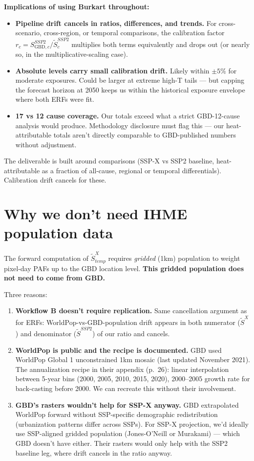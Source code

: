 \documentclass[11pt]{article}
\begin{document}
\textbf{Implications of using Burkart throughout:}
\begin{itemize}
\item \textbf{Pipeline drift cancels in ratios, differences, and trends.} For cross-scenario, cross-region, or temporal comparisons, the calibration factor $r_c = S^{SSP2}_{\text{GBD},c}/\tilde{S}^{SSP2}_c$ multiplies both terms equivalently and drops out (or nearly so, in the multiplicative-scaling case).
\item \textbf{Absolute levels carry small calibration drift.} Likely within $\pm 5\%$ for moderate exposures. Could be larger at extreme high-T tails --- but capping the forecast horizon at 2050 keeps us within the historical exposure envelope where both ERFs were fit.
\item \textbf{17 vs 12 cause coverage.} Our totals exceed what a strict GBD-12-cause analysis would produce. Methodology disclosure must flag this --- our heat-attributable totals aren't directly comparable to GBD-published numbers without adjustment.
\end{itemize}

The deliverable is built around comparisons (SSP-X vs SSP2 baseline, heat-attributable as a fraction of all-cause, regional or temporal differentials). Calibration drift cancels for these.

\section{Why we don't need IHME population data}

The forward computation of $\tilde{S}^X_{temp}$ requires \emph{gridded} (1km) population to weight pixel-day PAFs up to the GBD location level. \textbf{This gridded population does not need to come from GBD.}

Three reasons:
\begin{enumerate}
\item \textbf{Workflow B doesn't require replication.} Same cancellation argument as for ERFs: WorldPop-vs-GBD-population drift appears in both numerator ($\tilde{S}^X$) and denominator ($\tilde{S}^{SSP2}$) of our ratio and cancels.

\item \textbf{WorldPop is public and the recipe is documented.} GBD used WorldPop Global 1 unconstrained 1km mosaic (last updated November 2021). The annualization recipe in their appendix (p.~26): linear interpolation between 5-year bins (2000, 2005, 2010, 2015, 2020), 2000--2005 growth rate for back-casting before 2000. We can recreate this without their involvement.

\item \textbf{GBD's rasters wouldn't help for SSP-X anyway.} GBD extrapolated WorldPop forward without SSP-specific demographic redistribution (urbanization patterns differ across SSPs). For SSP-X projection, we'd ideally use SSP-aligned gridded population (Jones-O'Neill or Murakami) --- which GBD doesn't have either. Their rasters would only help with the SSP2 baseline leg, where drift cancels in the ratio anyway.
\end{enumerate}
\end{document}
